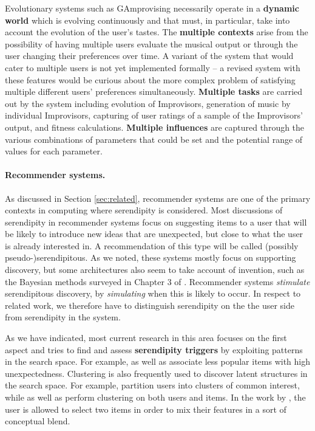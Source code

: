 Evolutionary systems such as {\sf GAmprovising} necessarily operate in a \textbf{dynamic world} which is evolving continuously and that must, in particular, take into account the evolution of the user's tastes. The \textbf{multiple contexts} arise from the possibility of having multiple users evaluate the musical output or through the user changing their preferences over time.  A variant of the system that would cater to multiple users is not yet implemented formally -- a revised system with these features would be curious about the more complex problem of satisfying multiple different users' preferences simultaneously.  \textbf{Multiple tasks} are carried out by the system including evolution of Improvisors, generation of music by individual Improvisors, capturing of user ratings of a sample of the Improvisors' output, and fitness calculations. \textbf{Multiple influences} are captured through the various combinations of parameters that could be set and the potential range of values for each parameter. 

\paragraph{Recommender systems.} 
As discussed in Section \ref{sec:related}, recommender systems are one
of the primary contexts in computing where serendipity is considered. Most discussions of serendipity in recommender systems focus on suggesting items to a user that will be likely to introduce new ideas that are unexpected, but close to what the user is already interested in. A recommendation of this type will be called (possibly pseudo-)serendipitous. As we noted, these systems mostly focus on supporting discovery, but some architectures also seem to take account of invention, such as the Bayesian methods surveyed in Chapter 3 of . Recommender systems \emph{stimulate} serendipitous discovery, by \emph{simulating} when this is likely to occur. In respect to related work, we therefore have to distinguish serendipity on the the user side from serendipity in the system. 

As we have indicated, most current research in this area focuses on the first aspect and tries to find and assess \textbf{serendipity triggers} by exploiting patterns in the search space. For example,  as well as  associate less popular items with high unexpectedness. Clustering is also frequently used to discover latent structures in the search space. For example,  partition users into clusters of common interest, while  as well as  perform clustering on both users and items. In the work by , the user is allowed to select two items in order to mix their features in a sort of conceptual blend.

